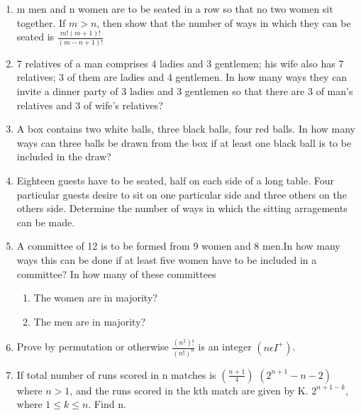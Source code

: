 \begin{enumerate}[label=\arabic*.,ref=\thesubsection.\theenumi]
\item m men and n women are to be seated in a row so that no two women sit together. If $m>n$, then show that the number of ways in which they can be seated is $\frac{m!(m+1)!}{(m-n+1)!}$\\
\item 7 relatives of a man comprises 4 ladies and 3 gentlemen; his wife also has 7 relatives; 3 of them are ladies and 4 gentlemen. In how many ways they can invite a dinner party of 3 ladies and 3 gentlemen so that there are 3 of man's relatives and 3 of wife's relatives?\\
\item A box contains two white balls, three black balls, four red balls. In how many ways can three balls be drawn from the box if at least one black ball is to be included in the draw?\\
\item Eighteen guests have to be seated, half on each side of a long table. Four particular guests desire to sit on one particular side and three others on the others side. Determine the number of ways in which the sitting arragements can be made.\\
\item A committee of 12 is to be formed from 9 women and 8 men.In how many ways this can be done if at least five women have to be included in a committee? In how many of these committees
\begin{enumerate}
\item The women are in majority?
\item The men are in majority?\\
\end{enumerate}
\item Prove by permutation or otherwise $\frac{(n^2)!}{(n!)^n}$ is an integer $(n\epsilon I^+)$.\\
\item If total number of runs scored in n matches is $(\frac{n+1}{4})$ $(2^{n+1}-n-2)$ where $n>1$, and the runs scored in the kth match are given by K. $2^{n+1-k}$, where $1\leq k\leq n.$ Find n.\\


\end{enumerate}
